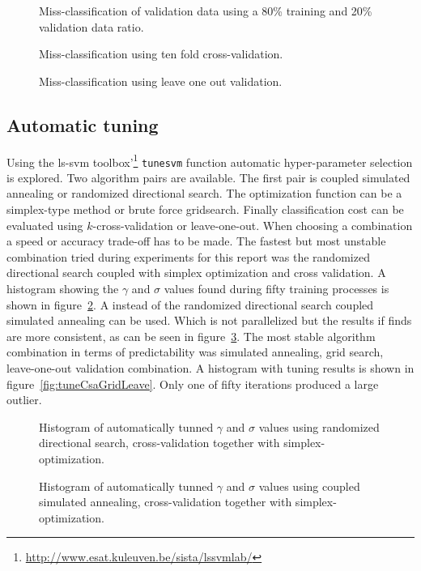 \begin{figure}
\centering

\caption{Miss-classification of validation data using a 80\% training and 20\% validation data ratio.}
\label{fig:classicClass}

\caption{Miss-classification using ten fold cross-validation.}
\label{fig:crossClass}

\caption{Miss-classification using leave one out validation.}
\label{fig:looClass}
\end{figure}

\subsection{Automatic tuning}
Using the ls-svm toolbox'\footnote{\url{http://www.esat.kuleuven.be/sista/lssvmlab/}} \texttt{tunesvm} function automatic hyper-parameter selection is explored. Two algorithm pairs are available. The first pair is coupled simulated annealing or randomized directional search. The optimization function can be a simplex-type method or brute force gridsearch. Finally classification cost can be evaluated using $k$-cross-validation or leave-one-out. When choosing a combination a speed or accuracy trade-off has to be made. The fastest but most unstable combination tried during experiments for this report was the randomized directional search coupled with simplex optimization and cross validation. A histogram showing the $\gamma$ and $\sigma$ values found during fifty training processes is shown in figure~\ref{fig:tuneDsSimplexCrossv}.
A instead of the randomized directional search coupled simulated annealing can be used. Which is not parallelized but the results if finds are more consistent, as can be seen in figure~\ref{fig:tuneCsaSimplexCrossv}. The most stable algorithm combination in terms of predictability was simulated annealing, grid search, leave-one-out validation combination. A histogram with tuning results is shown in figure~\ref{fig:tuneCsaGridLeave}. Only one of fifty iterations produced a large outlier. 


\begin{figure}
\centering


\caption{Histogram of automatically tunned  $\gamma$ and $\sigma$ values using randomized directional search, cross-validation together with simplex-optimization.}
\label{fig:tuneDsSimplexCrossv}
\end{figure}
\begin{figure}
\centering


\caption{Histogram of automatically tunned  $\gamma$ and $\sigma$ values using coupled simulated annealing, cross-validation together with simplex-optimization.}
\label{fig:tuneCsaSimplexCrossv}
\end{figure}

